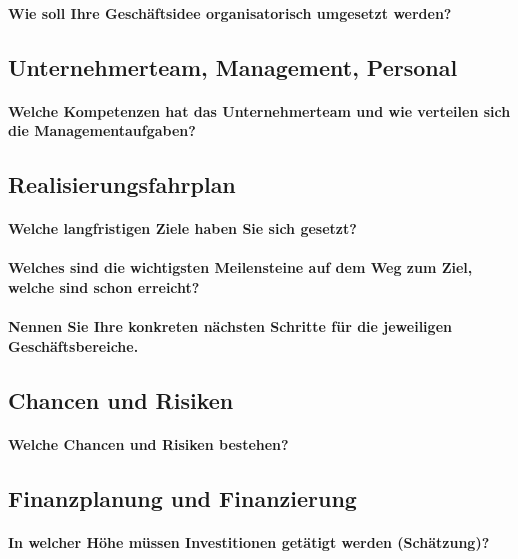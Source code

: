 \documentclass{article}
\begin{document}
\paragraph{Wie soll Ihre Geschäftsidee organisatorisch umgesetzt werden?}


\subsection{Unternehmerteam, Management, Personal}
\paragraph{Welche Kompetenzen hat das Unternehmerteam und wie verteilen sich die Managementaufgaben?}


\subsection{Realisierungsfahrplan}
\paragraph{Welche langfristigen Ziele haben Sie sich gesetzt?}

\paragraph{Welches sind die wichtigsten Meilensteine auf dem Weg zum Ziel, welche sind schon erreicht?}

\paragraph{Nennen Sie Ihre konkreten nächsten Schritte für die jeweiligen Geschäftsbereiche.}


\subsection{Chancen und Risiken}
\paragraph{Welche Chancen und Risiken bestehen?}


\subsection{Finanzplanung und Finanzierung}
\paragraph{In welcher Höhe müssen Investitionen getätigt werden (Schätzung)?}
\end{document}
